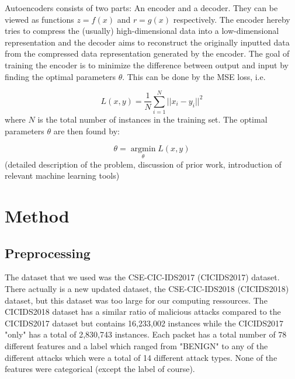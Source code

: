 \documentclass[]{article}
\begin{document}
 	  Autoencoders consists of two parts: An encoder and a decoder. They can be viewed as functions $z = f(x)$ and $r = g(x)$ respectively. The encoder hereby tries to compress the (usually) high-dimensional data into a low-dimensional representation and the decoder aims to reconstruct the originally inputted data from the compressed data representation generated by the encoder. The goal of training the encoder is to minimize the difference between output and input by finding the optimal parameters $\theta$. This can be done by the MSE loss, i.e. 
 	  
 	  \begin{equation}
 	  	L(x, y) =  \frac{1}{N} \sum_{i=1}^{N} ||x_i - y_i ||^2
 	  \end{equation}
 	  where $N$ is the total number of instances in the training set. The optimal parameters $\theta$ are then found by:
 	  
 	  \begin{equation}
 	  	\theta = \operatorname*{argmin}_\theta
 	  	 L(x,y)
 	  \end{equation}
 	  	(detailed description of the problem, discussion of prior work, introduction of relevant machine learning tools)
	 \section{Method}
	 
	 \subsection{Preprocessing}
	 The dataset that we used was the CSE-CIC-IDS2017 (CICIDS2017) dataset. There actually is a new updated dataset, the CSE-CIC-IDS2018 (CICIDS2018) dataset, but this dataset was too large for our computing ressources. The CICIDS2018 dataset has a similar ratio of malicious attacks compared to the CICIDS2017 dataset but contains 16,233,002 instances while the CICIDS2017 "only" has a total of 2,830,743 instances. Each packet has a total number of 78 different features and a label which ranged from "BENIGN" to any of the different attacks which were a total of 14 different attack types. None of the features were categorical (except the label of course). 
	 \newline
	 
\end{document}
